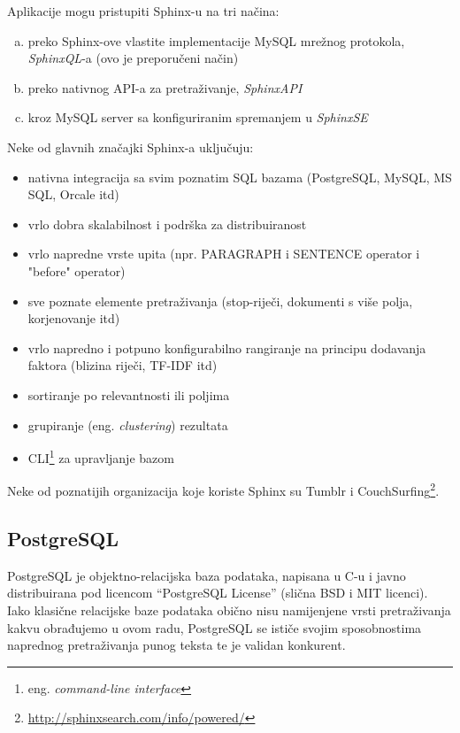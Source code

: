 \documentclass[a4paper,twoside,12pt]{scrreprt}
\begin{document}
Aplikacije mogu pristupiti Sphinx-u na tri načina:

\begin{enumerate}[(a)]
  \item preko Sphinx-ove vlastite implementacije MySQL mrežnog protokola, \textit{SphinxQL}-a (ovo je preporučeni način)
  \item preko nativnog API-a za pretraživanje, \textit{SphinxAPI}
  \item kroz MySQL server sa konfiguriranim spremanjem u \textit{SphinxSE}
\end{enumerate}

Neke od glavnih značajki Sphinx-a uključuju:

\begin{itemize}
  \item nativna integracija sa svim poznatim SQL bazama (PostgreSQL, MySQL, MS SQL, Orcale itd)
  \item vrlo dobra skalabilnost i podrška za distribuiranost
  \item vrlo napredne vrste upita (npr. PARAGRAPH i SENTENCE operator i "before" operator)
  \item sve poznate elemente pretraživanja (stop-riječi, dokumenti s više polja, korjenovanje itd)
  \item vrlo napredno i potpuno konfigurabilno rangiranje na principu dodavanja faktora (blizina riječi, TF-IDF itd)
  \item sortiranje po relevantnosti ili poljima
  \item grupiranje (eng. \textit{clustering}) rezultata
  \item CLI\footnote{eng. \textit{command-line interface}} za upravljanje bazom
\end{itemize}

Neke od poznatijih organizacija koje koriste Sphinx su Tumblr i CouchSurfing\footnote{\url{http://sphinxsearch.com/info/powered/}}.

\subsection{PostgreSQL}

PostgreSQL je objektno-relacijska baza podataka, napisana u C-u i javno distribuirana pod licencom ``PostgreSQL License'' (slična BSD i MIT licenci). Iako klasične relacijske baze podataka obično nisu namijenjene vrsti pretraživanja kakvu obrađujemo u ovom radu, PostgreSQL se ističe svojim sposobnostima naprednog pretraživanja punog teksta te je validan konkurent.
\end{document}
